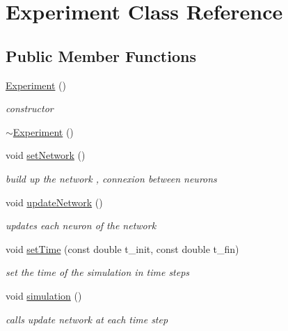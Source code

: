 \hypertarget{classExperiment}{\section{Experiment Class Reference}
\label{classExperiment}
}
\subsection*{Public Member Functions}
\begin{DoxyCompactItemize}
\item 
\hypertarget{classExperiment_a303e6a05d99f403ff4793495a2fbff58}{\hyperlink{classExperiment_a303e6a05d99f403ff4793495a2fbff58}{Experiment} ()}\label{classExperiment_a303e6a05d99f403ff4793495a2fbff58}

\begin{DoxyCompactList}\small\item\em constructor \end{DoxyCompactList}\item 
\hyperlink{classExperiment_a96058d848040e45948bbb60623711da6}{$\sim$\-Experiment} ()
\item 
void \hyperlink{classExperiment_a4f384c4aa52147e9c38c01dce850071f}{set\-Network} ()
\begin{DoxyCompactList}\small\item\em build up the network , connexion between neurons \end{DoxyCompactList}\item 
void \hyperlink{classExperiment_a41395f7cab731966396573a78ebc2756}{update\-Network} ()
\begin{DoxyCompactList}\small\item\em updates each neuron of the network \end{DoxyCompactList}\item 
void \hyperlink{classExperiment_a0bd96c4a240d059958ae700204f5f69d}{set\-Time} (const double t\-\_\-init, const double t\-\_\-fin)
\begin{DoxyCompactList}\small\item\em set the time of the simulation in time steps \end{DoxyCompactList}\item 
void \hyperlink{classExperiment_aa41fd11bae28b7b29f974239e293d052}{simulation} ()
\begin{DoxyCompactList}\small\item\em calls update network at each time step \end{DoxyCompactList}\end{DoxyCompactItemize}


